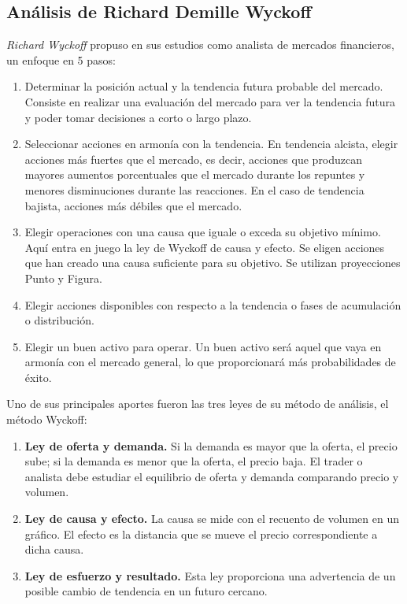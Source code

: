 \subsection{Análisis de Richard Demille Wyckoff}

\textit{Richard Wyckoff} propuso en sus estudios como analista de mercados financieros, un enfoque en 5 pasos:\newline

\begin{enumerate}
	\item Determinar la posición actual y la tendencia futura probable del mercado. Consiste en realizar una evaluación del mercado para ver la tendencia futura y poder tomar decisiones a corto o largo plazo.
	\item Seleccionar acciones en armonía con la tendencia. En tendencia alcista, elegir acciones más fuertes que el mercado, es decir, acciones que produzcan mayores aumentos porcentuales que el mercado durante los repuntes y menores disminuciones durante las reacciones. En el caso de tendencia bajista, acciones más débiles que el mercado.
	\item Elegir operaciones con una causa que iguale o exceda su objetivo mínimo. Aquí entra en juego la ley de Wyckoff de causa y efecto. Se eligen acciones que han creado una causa suficiente para su objetivo. Se utilizan proyecciones Punto y Figura.
	\item Elegir acciones disponibles con respecto a la tendencia o fases de acumulación o distribución.
	\item Elegir un buen activo para operar. Un buen activo será aquel que vaya en armonía con el mercado general, lo que proporcionará más probabilidades de éxito.
\end{enumerate}

Uno de sus principales aportes fueron las tres leyes de su método de análisis, el método Wyckoff:\newline

\begin{enumerate}
	\item \textbf{Ley de oferta y demanda.} Si la demanda es mayor que la oferta, el precio sube; si la demanda es menor que la oferta, el precio baja. El trader o analista debe estudiar el equilibrio de oferta y demanda comparando precio y volumen.
	\item \textbf{Ley de causa y efecto.} La causa se mide con el recuento de volumen en un gráfico. El efecto es la distancia que se mueve el precio correspondiente a dicha causa.
	\item \textbf{Ley de esfuerzo y resultado.} Esta ley proporciona una advertencia de un posible cambio de tendencia en un futuro cercano.
\end{enumerate}


